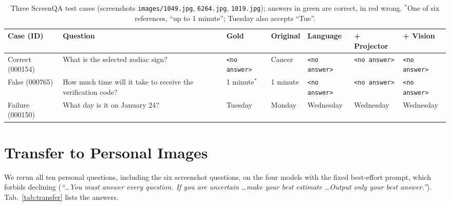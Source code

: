\documentclass[10pt,twocolumn,letterpaper]{article}
\newcommand{\noans}{\texttt{\textless no answer\textgreater}}
\newcommand{\good}[1]{\textcolor{okgreen}{#1}}
\newcommand{\bad}[1]{\textcolor{badred}{#1}}
\begin{document}
\begin{table}[t]
  \centering
  \footnotesize
  \setlength{\tabcolsep}{3pt}
  \begin{tabular}{p{1.9cm}p{4.2cm}lllll}
    \toprule
    Case (ID) & Question & Gold & Original & Language & + Projector & + Vision \\
    \midrule
    Correct (000154) & What is the selected zodiac sign? & \noans & \bad{Cancer} & \good{\noans} & \good{\noans} & \good{\noans} \\
    False (000765) & How much time will it take to receive the verification code? & 1 minute$^\ast$ & \good{1 minute} & \bad{\noans} & \bad{\noans} & \bad{\noans} \\
    Failure (000150) & What day is it on January 24? & Tuesday & \bad{Monday} & \bad{Wednesday} & \bad{Wednesday} & \bad{Wednesday} \\
    \bottomrule
  \end{tabular}
  \caption{Three ScreenQA test cases (screenshots \texttt{images/1049.jpg}, \texttt{6264.jpg}, \texttt{1019.jpg}); answers in \good{green} are correct, in \bad{red} wrong. $^\ast$One of six references, \eg ``up to 1 minute''; Tuesday also accepts ``Tue''.}
  \label{tab:cases}
\end{table}

\section{Transfer to Personal Images}
\label{sec:transfer}

We rerun all ten personal questions, including the six screenshot questions, on the four models with the fixed best-effort prompt, which forbids declining (\emph{``\ldots You must answer every question. If you are uncertain \ldots make your best estimate \ldots Output only your best answer.''}). Tab.~\ref{tab:transfer} lists the answers.
\end{document}
